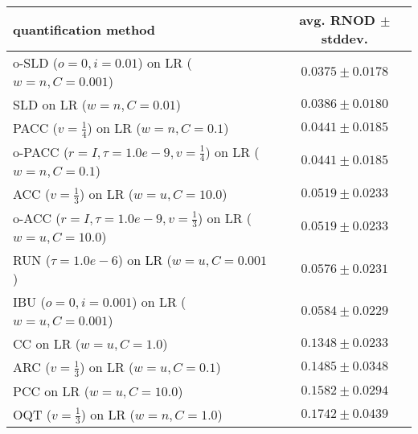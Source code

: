 \begin{tabular}{lc}
  \toprule
  quantification method & avg. RNOD $\pm$ stddev. \\
  \midrule
  o-SLD ($o=0, i=0.01$) on LR ($w=n, C=0.001$) & $\mathbf{0.0375 \pm 0.0178}$ \\
  SLD on LR ($w=n, C=0.01$) & $0.0386 \pm 0.0180$ \\
  PACC ($v=\frac{1}{4}$) on LR ($w=n, C=0.1$) & $0.0441 \pm 0.0185$ \\
  o-PACC ($r=I, \tau=1.0e-9, v=\frac{1}{4}$) on LR ($w=n, C=0.1$) & $0.0441 \pm 0.0185$ \\
  ACC ($v=\frac{1}{3}$) on LR ($w=u, C=10.0$) & $0.0519 \pm 0.0233$ \\
  o-ACC ($r=I, \tau=1.0e-9, v=\frac{1}{3}$) on LR ($w=u, C=10.0$) & $0.0519 \pm 0.0233$ \\
  RUN ($\tau=1.0e-6$) on LR ($w=u, C=0.001$) & $0.0576 \pm 0.0231$ \\
  IBU ($o=0, i=0.001$) on LR ($w=u, C=0.001$) & $0.0584 \pm 0.0229$ \\
  CC on LR ($w=u, C=1.0$) & $0.1348 \pm 0.0233$ \\
  ARC ($v=\frac{1}{3}$) on LR ($w=u, C=0.1$) & $0.1485 \pm 0.0348$ \\
  PCC on LR ($w=u, C=10.0$) & $0.1582 \pm 0.0294$ \\
  OQT ($v=\frac{1}{3}$) on LR ($w=n, C=1.0$) & $0.1742 \pm 0.0439$ \\
  \bottomrule
\end{tabular}
